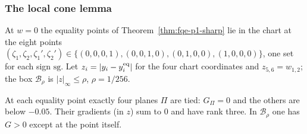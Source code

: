 \subsubsection*{The local cone lemma}
At $w=0$ the equality points of Theorem~\ref{thm:fqe-p1-sharp} lie in the chart at the eight points
$(\zeta_1,\zeta_2,\zeta_1',\zeta_2')\in\{(0,0,0,1),(0,0,1,0),(0,1,0,0),(1,0,0,0)\}$, one set for each sign $\mathrm{sg}$.
Let $z_i=|y_i-y^{\rm eq}_i|$ for the four chart coordinates and $z_{5,6}=w_{1,2}$; the box $\mathcal B_\rho$ is
$|z|_\infty\le\rho$, $\rho=1/256$.
\begin{lemma}\label{lem:fqe-critical-local-cone}
At each equality point exactly four planes $\Pi$ are tied: $G_\Pi=0$ and the others are below $-0.05$.  Their gradients (in $z$)
sum to $0$ and have rank three.  In $\mathcal B_\rho$ one has $G>0$ except at the point itself.
\end{lemma}
